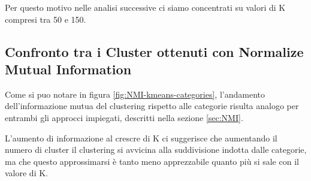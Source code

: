 \documentclass[
	11pt, %
	a4paper, %
	oneside, %
	headinclude,footinclude, %
	BCOR5mm, %
]{scrartcl}
\begin{document}
	Per questo motivo nelle analisi successive ci siamo concentrati su valori di K compresi tra 50 e 150.

	\subsection{Confronto tra i Cluster ottenuti con Normalize Mutual Information}
		Come si puo notare in figura \ref{fig:NMI-kmeans-categories}, l'andamento dell'informazione mutua del clustering rispetto alle categorie risulta analogo per entrambi gli approcci impiegati, descritti nella sezione \ref{sec:NMI}.

		L'aumento di informazione al crescre di K ci suggerisce che aumentando il numero di cluster il clustering si avvicina alla suddivisione indotta dalle categorie, ma che questo approssimarsi è tanto meno apprezzabile quanto più si sale con il valore di K.
\end{document}
